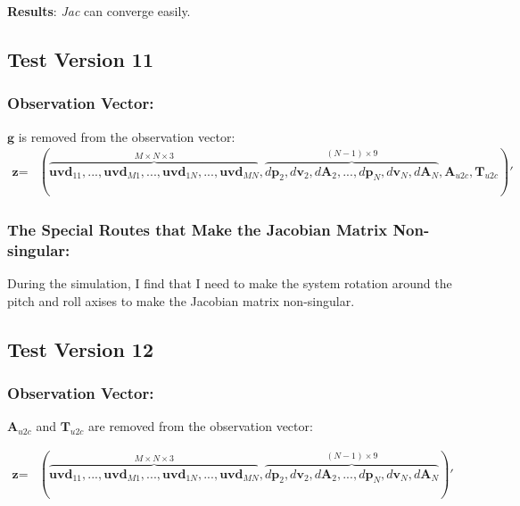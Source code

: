 \documentclass[12pt]{article}   %
\begin{document}
\medskip
\noindent\textbf{Results}: \textit{Jac} can converge easily.




\subsection{Test Version 11}
\subsubsection{Observation Vector:}

$\textbf{g}$ is removed from the observation vector: 
\begin{align*}
\textbf{z}=&(\overbrace{\textbf{uvd}_{11}, ... , \textbf{uvd}_{M1}, ..., \textbf{uvd}_{1N}, ... , \textbf{uvd}_{MN}}^{M \times N \times 3}, \overbrace{d\textbf{p}_2, d\textbf{v}_2, d\textbf{A}_2, ..., d\textbf{p}_N, d\textbf{v}_N, d\textbf{A}_N}^{(N-1) \times 9}, \textbf{A}_{u2c}, \textbf{T}_{u2c})'
\end{align*}

\subsubsection{The Special Routes that Make the Jacobian Matrix Non-singular:}

During the simulation, I find that I need to make the system rotation around the pitch and roll axises to make the Jacobian matrix non-singular.

\subsection{Test Version 12}
\subsubsection{Observation Vector:}
$\textbf{A}_{u2c}$ and $\textbf{T}_{u2c}$ are removed from the observation vector: 
 
\begin{align*}
\textbf{z}=&(\overbrace{\textbf{uvd}_{11}, ... , \textbf{uvd}_{M1}, ..., \textbf{uvd}_{1N}, ... , \textbf{uvd}_{MN}}^{M \times N \times 3}, \overbrace{d\textbf{p}_2, d\textbf{v}_2, d\textbf{A}_2, ..., d\textbf{p}_N, d\textbf{v}_N, d\textbf{A}_N}^{(N-1) \times 9})'
\end{align*}
\end{document}
